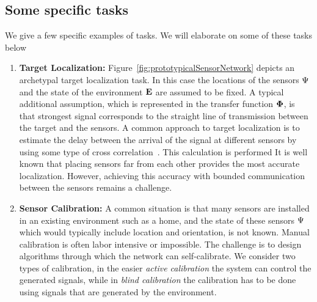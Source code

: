 \subsection{Some specific tasks}\label{sec:examples}
We give a few specific examples of tasks. We will elaborate on some of these tasks below
\begin{enumerate}
    \item {\bf Target Localization:}
      Figure~\ref{fig:prototypicalSensorNetwork} depicts an archetypal
      target localization task. In this case the locations of the
      sensors $\Psi$ and the state of the environment $\mathbf{E}$ are
      assumed to be fixed. A typical additional assumption, which is
      represented in the transfer function $\mathbf{\Phi}$, is that
      strongest signal corresponds to the straight line of
      transmission between the target and the sensors. A common
      approach to target localization is to estimate the delay between
      the arrival of the signal at different sensors by using some
      type of cross correlation~\cite{}. This calculation is performed  
      It is well known that placing sensors far from each other
      provides the most accurate localization. However, achieving this
      accuracy with bounded communication between the sensors remains
      a challenge.

    \item{\bf Sensor Calibration:} A common situation is that many sensors
      are installed in an existing environment such as a home, and
      the state of these sensors $\Psi$ which would typically
      include location and orientation, is not known. Manual
      calibration is often labor intensive or impossible. The
      challenge is to design algorithms through which the network can
      self-calibrate. We consider two types of calibration, in the
      easier {\em active calibration} the system can control the generated
      signals, while in {\em blind calibration} the calibration has to
      be done using signals that are generated by the environment. 

    

\end{enumerate}
